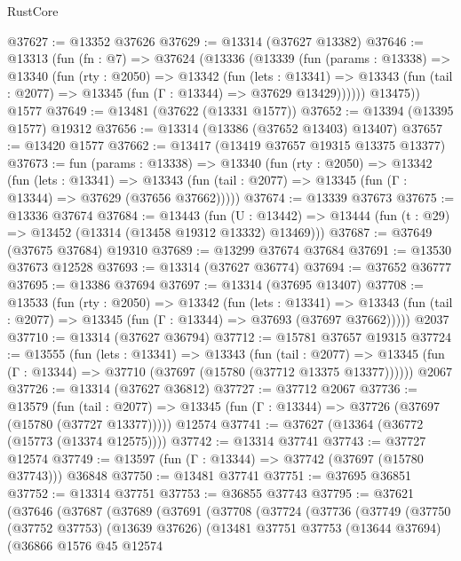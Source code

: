 \begin{lexlean}{RustCore}
\begin{coremodule}
@37627 := @13352 @37626
@37629 := @13314 (@37627 @13382)
@37646 := @13313
    (fun (fn : @7) =>
    @37624
      (@13336
        (@13339
          (fun (params : @13338) =>
          @13340
            (fun (rty : @2050) =>
            @13342
              (fun (lets : @13341) =>
              @13343 (fun (tail : @2077) => @13345 (fun (Γ : @13344) => @37629 @13429))))))
        @13475))
    @1577
@37649 := @13481 (@37622 (@13331 @1577))
@37652 := @13394 (@13395 @1577) @19312
@37656 := @13314 (@13386 (@37652 @13403) @13407)
@37657 := @13420 @1577
@37662 := @13417 (@13419 @37657 @19315 @13375 @13377)
@37673 := fun (params : @13338) =>
  @13340
    (fun (rty : @2050) =>
    @13342
      (fun (lets : @13341) =>
      @13343 (fun (tail : @2077) => @13345 (fun (Γ : @13344) => @37629 (@37656 @37662)))))
@37674 := @13339 @37673
@37675 := @13336 @37674
@37684 := @13443
    (fun (U : @13442) => @13444 (fun (t : @29) => @13452 (@13314 (@13458 @19312 @13332) @13469)))
@37687 := @37649 (@37675 @37684) @19310
@37689 := @13299 @37674 @37684
@37691 := @13530 @37673 @12528
@37693 := @13314 (@37627 @36774)
@37694 := @37652 @36777
@37695 := @13386 @37694
@37697 := @13314 (@37695 @13407)
@37708 := @13533
    (fun (rty : @2050) =>
    @13342
      (fun (lets : @13341) =>
      @13343 (fun (tail : @2077) => @13345 (fun (Γ : @13344) => @37693 (@37697 @37662)))))
    @2037
@37710 := @13314 (@37627 @36794)
@37712 := @15781 @37657 @19315
@37724 := @13555
    (fun (lets : @13341) =>
    @13343
      (fun (tail : @2077) =>
      @13345 (fun (Γ : @13344) => @37710 (@37697 (@15780 (@37712 @13375 @13377))))))
    @2067
@37726 := @13314 (@37627 @36812)
@37727 := @37712 @2067
@37736 := @13579
    (fun (tail : @2077) => @13345 (fun (Γ : @13344) => @37726 (@37697 (@15780 (@37727 @13377)))))
    @12574
@37741 := @37627 (@13364 (@36772 (@15773 (@13374 @12575))))
@37742 := @13314 @37741
@37743 := @37727 @12574
@37749 := @13597 (fun (Γ : @13344) => @37742 (@37697 (@15780 @37743))) @36848
@37750 := @13481 @37741
@37751 := @37695 @36851
@37752 := @13314 @37751
@37753 := @36855 @37743
@37795 := @37621
    (@37646
      (@37687
        (@37689
          (@37691
            (@37708
              (@37724
                (@37736
                  (@37749
                    (@37750
                      (@37752 @37753)
                      (@13639 @37626)
                      (@13481
                        @37751
                        @37753
                        (@13644 @37694)
                        (@36866
                          @1576
                          @45
                          @12574

\end{coremodule}
\end{lexlean}

